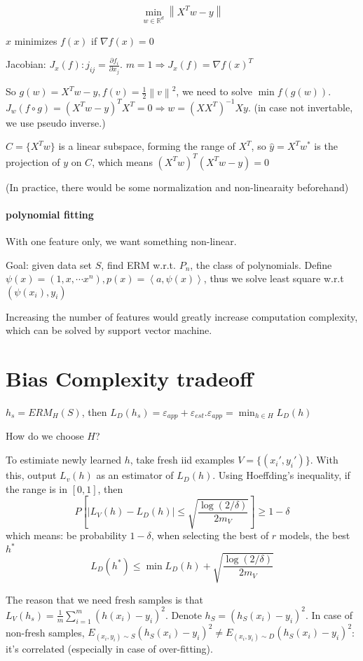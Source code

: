 \documentclass{book}
\newcommand{\R}{\mathbb{R}}
\newcommand{\pp}[2]{\frac{\partial #1}{\partial #2}}
\newcommand{\nm}[1]{\left\|#1\right\|}
\newcommand{\dual}[1]{\left<#1\right>}
\begin{document}
\[\min_{w\in\R^{d}}\nm{X^{T}w-y}\]

$x$ minimizes $f(x)$ if $\nabla f(x)=0$

Jacobian: $J_{x}(f): j_{ij}=\pp{f_{i}}{x_{j}}$. $m=1\Rightarrow J_{x}(f)=\nabla f(x)^{T}$

So $g(w)=X^{T}w-y,f(v)=\frac{1}{2}\nm{v}^{2}$, we need to solve $\min f(g(w))$. $J_{w}(f\circ g)=(X^{T}w-y)^{T}X^{T}=0\Rightarrow w=(XX^{T})^{-1}Xy$. (in case not invertable, we use pseudo inverse.)

$C=\{X^{T}w\}$ is a linear subspace, forming the range of $X^{T}$, so $\hat y=X^{T}w^{*}$ is the projection of $y$ on $C$, which means $(X^{T}w)^{T}(X^{T}w-y)=0$

(In practice, there would be some normalization and non-linearaity beforehand)

\paragraph{polynomial fitting}
With one feature only, we want something non-linear.

Goal: given data set $S$, find ERM w.r.t. $P_{n}$, the class of polynomials. Define $\psi(x)=(1,x,\cdots x^{n}), p(x)=\dual{a,\psi(x)}$, thus we solve least square w.r.t $(\psi(x_{i}),y_{i})$

Increasing the number of features would greatly increase computation complexity, which can be solved by support vector machine.

\section{Bias Complexity tradeoff}
$h_{s}=ERM_{H}(S)$, then $L_{D}(h_{s})=\varepsilon_{app}+\varepsilon_{est}. \varepsilon_{app}=\min_{h\in H}L_{D}(h)$


How do we choose $H$?

To estimiate newly learned $h$, take fresh iid examples $V=\{(x_{i}',y_{i}')\}$. With this, output $L_{v}(h)$ as an estimator of $L_{D}(h)$. Using Hoeffding's inequality, if the range is in $[0,1]$, then
\[P[|L_{V}(h)-L_{D}(h)|\leq\sqrt{\frac{\log(2/\delta)}{2m_{V}}}]\geq 1-\delta\]
which means: be probability $1-\delta$, when selecting the best of $r$ models, the best $h^{*}$
\[ L_{D}(h^{*})\leq \min L_{D}(h)+\sqrt{\frac{\log(2/\delta)}{2m_{V}}}\]

The reason that we need fresh samples is that $L_{V}(h_{s})=\frac{1}{m}\sum_{i=1}^{m}(h(x_{i})-y_{i})^{2}$. Denote $h_{S}=(h_{S}(x_{i})-y_{i})^{2}$. In case of non-fresh samples, $E_{(x_{i},y_{i})\sim S}(h_{S}(x_{i})-y_{i})^{2}\neq E_{(x_{i},y_{i})\sim D}(h_{S}(x_{i})-y_{i})^{2}$: it's correlated (especially in case of over-fitting). 
\end{document}
